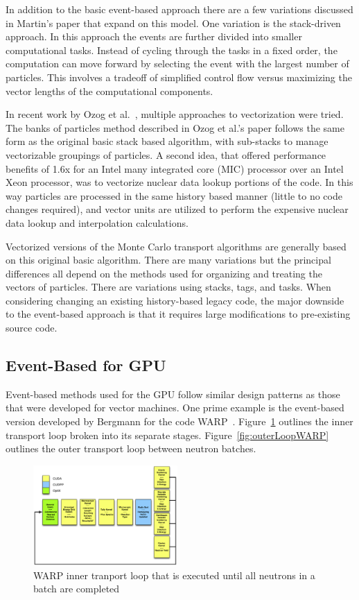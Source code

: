 In addition to the basic event-based approach there are a few variations discussed in Martin's paper that expand on this model.
%
One variation is the stack-driven approach.
%
In this approach the events are further divided into smaller computational tasks.
%
Instead of cycling through the tasks in a fixed order, the computation can move forward by selecting the event with the largest number of particles.
%
This involves a tradeoff of simplified control flow versus maximizing the vector lengths of the computational components.
%

In recent work by Ozog et al.~\cite{ozog2015performance}, multiple approaches to vectorization were tried.
%
The banks of particles method described in Ozog et al.'s paper follows the same form as the original basic stack based algorithm, with sub-stacks to manage vectorizable groupings of particles.
%
A second idea, that offered performance benefits of 1.6x for an Intel many integrated core (MIC) processor over an Intel Xeon processor, was to vectorize nuclear data lookup portions of the code.
%
In this way particles are processed in the same history based manner (little to no code changes required), and vector units are utilized to perform the expensive nuclear data lookup and interpolation calculations.

%
Vectorized versions of the Monte Carlo transport algorithms are generally based on this original basic algorithm.
%
There are many variations but the principal differences all depend on the methods used for organizing and treating the vectors of particles.
%
There are variations using stacks, tags, and tasks.
%
When considering changing an existing history-based legacy code, the major downside to the event-based approach is that it requires large modifications to pre-existing source code.
%

\subsection*{\textbf{Event-Based for GPU}}

%
Event-based methods used for the GPU follow similar design patterns as those that were developed for vector machines.
%
One prime example is the event-based version developed by Bergmann for the code WARP~\cite{2014development}.
%
Figure~\ref{fig:innerLoopWARP} outlines the inner transport loop broken into its separate stages.
%
Figure~\ref{fig:outerLoopWARP} outlines the outer transport loop between neutron batches.
%

\begin{figure}
\includegraphics[width=0.49\textwidth]{InnerLoopWARP}
\caption{WARP inner tranport loop that is executed until all neutrons in a batch are completed~\cite{2014development}}
\label{fig:innerLoopWARP}
\end{figure}

